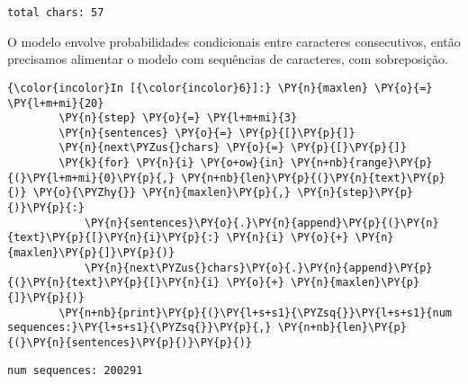     \begin{Verbatim}[commandchars=\\\{\}]
total chars: 57

    \end{Verbatim}

    O modelo envolve probabilidades condicionais entre caracteres
consecutivos, então precisamos alimentar o modelo com sequências de
caracteres, com sobreposição.

    \begin{Verbatim}[commandchars=\\\{\}]
{\color{incolor}In [{\color{incolor}6}]:} \PY{n}{maxlen} \PY{o}{=} \PY{l+m+mi}{20}
        \PY{n}{step} \PY{o}{=} \PY{l+m+mi}{3}
        \PY{n}{sentences} \PY{o}{=} \PY{p}{[}\PY{p}{]}
        \PY{n}{next\PYZus{}chars} \PY{o}{=} \PY{p}{[}\PY{p}{]}
        \PY{k}{for} \PY{n}{i} \PY{o+ow}{in} \PY{n+nb}{range}\PY{p}{(}\PY{l+m+mi}{0}\PY{p}{,} \PY{n+nb}{len}\PY{p}{(}\PY{n}{text}\PY{p}{)} \PY{o}{\PYZhy{}} \PY{n}{maxlen}\PY{p}{,} \PY{n}{step}\PY{p}{)}\PY{p}{:}
            \PY{n}{sentences}\PY{o}{.}\PY{n}{append}\PY{p}{(}\PY{n}{text}\PY{p}{[}\PY{n}{i}\PY{p}{:} \PY{n}{i} \PY{o}{+} \PY{n}{maxlen}\PY{p}{]}\PY{p}{)}
            \PY{n}{next\PYZus{}chars}\PY{o}{.}\PY{n}{append}\PY{p}{(}\PY{n}{text}\PY{p}{[}\PY{n}{i} \PY{o}{+} \PY{n}{maxlen}\PY{p}{]}\PY{p}{)}
        \PY{n+nb}{print}\PY{p}{(}\PY{l+s+s1}{\PYZsq{}}\PY{l+s+s1}{num sequences:}\PY{l+s+s1}{\PYZsq{}}\PY{p}{,} \PY{n+nb}{len}\PY{p}{(}\PY{n}{sentences}\PY{p}{)}\PY{p}{)}
\end{Verbatim}

    \begin{Verbatim}[commandchars=\\\{\}]
num sequences: 200291

    \end{Verbatim}

